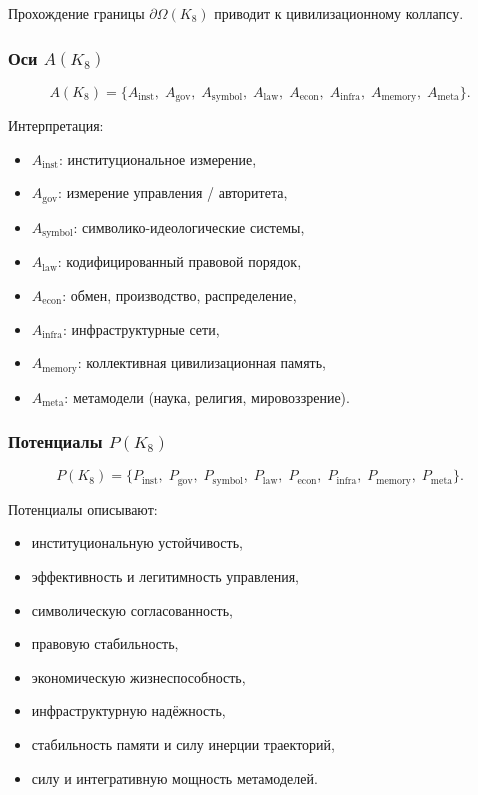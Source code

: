 Прохождение границы $\partial\Omega(K_8)$ приводит к цивилизационному
коллапсу.

\subsubsection{Оси \texorpdfstring{$A(K_8)$}{$A(K_8)$}}

\[
A(K_8)=
\{
A_{\mathrm{inst}},\;
A_{\mathrm{gov}},\;
A_{\mathrm{symbol}},\;
A_{\mathrm{law}},\;
A_{\mathrm{econ}},\;
A_{\mathrm{infra}},\;
A_{\mathrm{memory}},\;
A_{\mathrm{meta}}
\}.
\]

Интерпретация:
\begin{itemize}
    \item $A_{\mathrm{inst}}$: институциональное измерение,
    \item $A_{\mathrm{gov}}$: измерение управления / авторитета,
    \item $A_{\mathrm{symbol}}$: символико-идеологические системы,
    \item $A_{\mathrm{law}}$: кодифицированный правовой порядок,
    \item $A_{\mathrm{econ}}$: обмен, производство, распределение,
    \item $A_{\mathrm{infra}}$: инфраструктурные сети,
    \item $A_{\mathrm{memory}}$: коллективная цивилизационная память,
    \item $A_{\mathrm{meta}}$: метамодели (наука, религия, мировоззрение).
\end{itemize}

\subsubsection{Потенциалы \texorpdfstring{$P(K_8)$}{$P(K_8)$}}

\[
P(K_8)=
\{
P_{\mathrm{inst}},\;
P_{\mathrm{gov}},\;
P_{\mathrm{symbol}},\;
P_{\mathrm{law}},\;
P_{\mathrm{econ}},\;
P_{\mathrm{infra}},\;
P_{\mathrm{memory}},\;
P_{\mathrm{meta}}
\}.
\]

Потенциалы описывают:
\begin{itemize}
    \item институциональную устойчивость,
    \item эффективность и легитимность управления,
    \item символическую согласованность,
    \item правовую стабильность,
    \item экономическую жизнеспособность,
    \item инфраструктурную надёжность,
    \item стабильность памяти и силу инерции траекторий,
    \item силу и интегративную мощность метамоделей.
\end{itemize}


